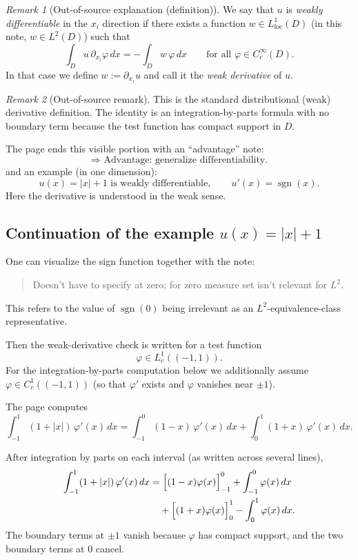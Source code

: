 \documentclass[11pt]{article}
\theoremstyle{definition}
\theoremstyle{remark}
\newtheorem{remark}{Remark}
\begin{document}
\begin{remark}[Out-of-source explanation (definition)]
We say that $u$ is \emph{weakly differentiable} in the $x_i$ direction if there exists a function $w\in L^1_{\mathrm{loc}}(D)$ (in this note, $w\in L^2(D)$) such that
\[
\int_D u\,\partial_{x_i}\varphi\,dx = -\int_D w\,\varphi\,dx
\qquad \text{for all }\varphi\in C_c^\infty(D).
\]
In that case we define $w:=\partial_{x_i}u$ and call it the \emph{weak derivative} of $u$.
\end{remark}

\begin{remark}[Out-of-source remark]
This is the standard distributional (weak) derivative definition. The identity is an integration-by-parts formula with no boundary term because the test function has compact support in $D$.
\end{remark}

The page ends this visible portion with an ``advantage'' note:
\[
\Rightarrow \text{ Advantage: generalize differentiability.}
\]
and an example (in one dimension):
\[
u(x)=|x|+1 \text{ is weakly differentiable},
\qquad
u'(x)=\operatorname{sgn}(x).
\]
Here the derivative is understood in the weak sense.

\subsection*{Continuation of the example $u(x)=|x|+1$}

One can visualize the sign function together with the note:
\begin{quote}
Doesn't have to specify at zero; for zero measure set isn't relevant for $L^2$.
\end{quote}
This refers to the value of $\operatorname{sgn}(0)$ being irrelevant as an $L^2$-equivalence-class representative.

Then the weak-derivative check is written for a test function
\[
\varphi \in L_c^1((-1,1)).
\]
For the integration-by-parts computation below we additionally assume $\varphi\in C_c^1((-1,1))$ (so that $\varphi'$ exists and $\varphi$ vanishes near $\pm 1$).

The page computes
\[
\int_{-1}^1 (1+|x|)\,\varphi'(x)\,dx
=
\int_{-1}^0 (1-x)\,\varphi'(x)\,dx
+
\int_0^1 (1+x)\,\varphi'(x)\,dx.
\]

After integration by parts on each interval (as written across several lines),
\[
\begin{aligned}
\int_{-1}^1 (1+|x|)\,\varphi'(x)\,dx
&=
\Bigl[(1-x)\varphi(x)\Bigr]_{-1}^{0}
+ \int_{-1}^{0}\varphi(x)\,dx \\
&\quad
+ \Bigl[(1+x)\varphi(x)\Bigr]_{0}^{1}
- \int_{0}^{1}\varphi(x)\,dx.
\end{aligned}
\]
The boundary terms at $\pm 1$ vanish because $\varphi$ has compact support, and the two boundary terms at $0$ cancel.
\end{document}
